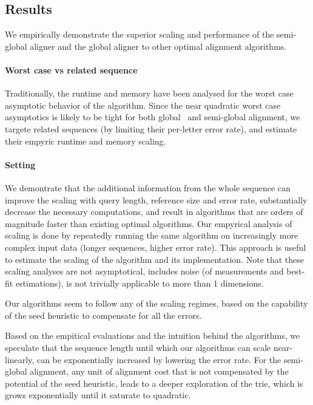 \subsection*{Results}

We empirically demonstrate the superior scaling and performance of the
semi-global aligner \astarix and the global aligner \astarpa to other optimal
alignment algorithms.

\paragraph{Worst case vs related sequence}
Traditionally, the runtime and memory have been analysed for the worst case
asymptotic behavior of the algorithm. Since the near quadratic worst case
asymptotics is likely to be tight for both global~\citep{backurs2015edit} and
semi-global alignment, we targete related sequences (by limiting their
per-letter error rate), and estimate their empyric runtime and memory scaling.

\paragraph{Setting}
We demontrate that the additional information from the whole sequence can
improve the scaling with query length, reference size and error rate,
substantially decrease the necessary computations, and result in algorithms that
are orders of magnitude faster than existing optimal algorithms. Our empyrical
analysis of scaling is done by repeatedly running the same algorithm on
increasingly more complex input data (longer sequences, higher error rate). This
approach is useful to estimate the scaling of the algorithm and its
implementation. Note that these scaling analyses are not asymptotical, includes
noise (of measurements and best-fit estimations), is not trivially applicable to
more than 1 dimensions.

Our algorithms seem to follow any of the scaling regimes, based on the
capability of the seed heuristic to compensate for all the errors.

Based on the empitical evaluations and the intuition behind the algorithms, we
speculate that the sequence length until which our algorithms can scale
near-linearly, can be exponentially increased by lowering the error rate. For
the semi-global alignment, any unit of alignment cost that is not compensated by
the potential of the seed heuristic, leads to a deeper exploration of the trie,
which is grows exponentially until it saturate to quadratic.

